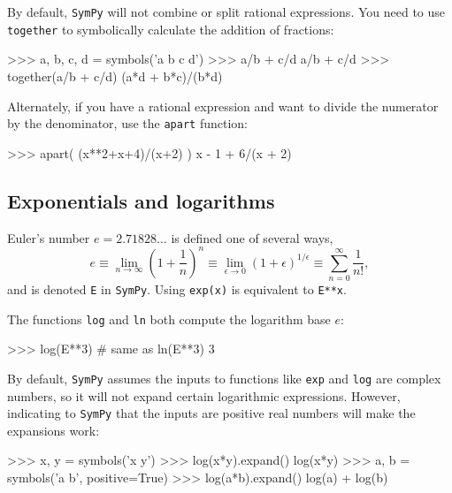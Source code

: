 \noindent
By default, \texttt{SymPy} will not combine or split rational expressions.
You need to use \texttt{together} to symbolically calculate the addition of fractions:									

\small
\begin{verbatimtab}
>>> a, b, c, d = symbols('a b c d')
>>> a/b + c/d
a/b + c/d
>>> together(a/b + c/d)
(a*d + b*c)/(b*d)
\end{verbatimtab}
\normalsize

\noindent
Alternately, if you have a rational expression and want to divide the numerator by the denominator,
use the \texttt{apart} function:

\small
\begin{verbatimtab}
>>> apart( (x**2+x+4)/(x+2)  )
x - 1  +  6/(x + 2)
\end{verbatimtab}
\normalsize


\subsection{Exponentials and logarithms}
\label{basics:exponentials_and_logarithms}

																								 
Euler's number $e=2.71828\ldots$ is defined one of several ways,												
\[
  e \equiv \lim_{n\to \infty} \left( 1 + \frac{1}{n}\right)^{n}
    \equiv \lim_{\epsilon \to 0} \left( 1 + \epsilon\right)^{1/\epsilon}
    \equiv \sum_{n=0}^\infty \frac{1}{n!},
\]
and is denoted \texttt{E} in \texttt{SymPy}.
Using \texttt{exp(x)} is equivalent to \texttt{E**x}.

The functions \texttt{log} and \texttt{ln} both compute the logarithm base $e$:

\small
\begin{verbatimtab}
>>> log(E**3)    # same as ln(E**3)
3
\end{verbatimtab}
\normalsize

\noindent
By default, \texttt{SymPy} assumes the inputs to functions like \texttt{exp} and \texttt{log} are complex numbers,
so it will not expand certain logarithmic expressions.
However, indicating to \texttt{SymPy} that the inputs are positive real numbers will make the expansions work:

\small
\begin{verbatimtab}
>>> x, y = symbols('x y')
>>> log(x*y).expand()
log(x*y)
>>> a, b = symbols('a b', positive=True)
>>> log(a*b).expand()
log(a) + log(b)
\end{verbatimtab}
\normalsize

